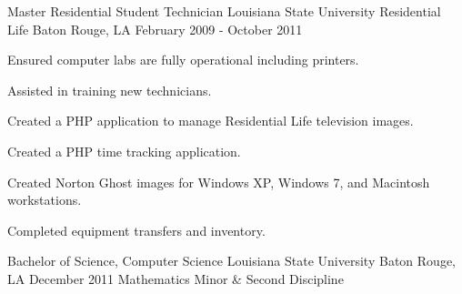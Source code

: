 \documentclass[letterpaper]{awesome-cv}
\begin{document}
\begin{cventries}
  \cventry
    {Master Residential Student Technician}
    {Louisiana State University Residential Life}
    {Baton Rouge, LA}
    {February 2009 - October 2011}
    {\begin{cvitems}
      \item {Ensured computer labs are fully operational including printers.}
      \item {Assisted in training new technicians.}
      \item {Created a PHP application to manage Residential Life television images.}
      \item {Created a PHP time tracking application.}
      \item {Created Norton Ghost images for Windows XP, Windows 7, and Macintosh workstations.}
      \item {Completed equipment transfers and inventory.}
      \end{cvitems}}
\end{cventries}
\begin{cventries}
	\cventry
    {Bachelor of Science, Computer Science}
    {Louisiana State University}
    {Baton Rouge, LA}
    {December 2011}
    {Mathematics Minor \& Second Discipline}
\end{cventries}

\pagebreak
\end{document}
